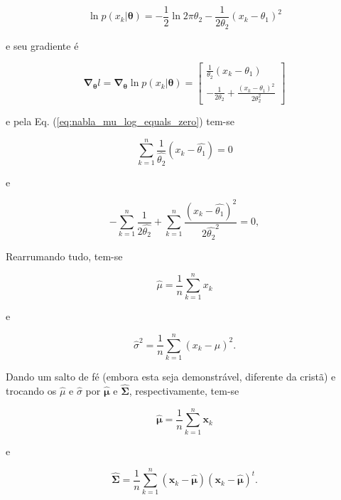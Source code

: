 \documentclass[a4paper,12pt,twocolumn]{article}
\newcommand{\equationref}[1]{Eq. (\ref{eq:#1})}
\newcommand{\tworowsmatrix}[2]
{
    \begin{bmatrix}
            #1\\
            #2
    \end{bmatrix}
}
\begin{document}
\begin{equation}
    \ln p(x_k|\boldsymbol{\theta}) = -\frac{1}{2} \ln 2\pi\theta_2 - \frac{1}{2\theta_2}(x_k - \theta_1)^2
    \label{eq:log_likelihood_mu_sigma_univar}
\end{equation}

\noindent e seu gradiente é

\begin{equation}
    \boldsymbol{\nabla}_{\boldsymbol{\theta}} l = \boldsymbol{\nabla}_{\boldsymbol{\theta}} \ln p(x_k|\boldsymbol{\theta}) = \tworowsmatrix{\frac{1}{\theta_2}(x_k - \theta_1)}{-\frac{1}{2\theta_2} + \frac{(x_k - \theta_1)^2}{2\theta_2^2}}
    \label{eq:grad_log_likelihood_mu_sigma_univar}
\end{equation}

\noindent e pela \equationref{nabla_mu_log_equals_zero} tem-se

\begin{equation}
    \sum_{k=1}^n \frac{1}{\hat{\theta_2}}(x_k - \hat{\theta_1}) = 0
    \label{eq:grad_log_likelihood_mu_sigma_univar_theta_1}
\end{equation}

\noindent e

\begin{equation}
    -\sum_{k=1}^n \frac{1}{2\hat{\theta_2}} + \sum_{k=1}^n \frac{(x_k - \hat{\theta_1})^2}{2\hat{\theta_2}^2} = 0,
    \label{eq:grad_log_likelihood_mu_sigma_univar_theta_2}
\end{equation}

\noindent Rearrumando tudo, tem-se

\begin{equation}
    \hat{\mu} = \frac{1}{n} \sum_{k=1}^n x_k
    \label{eq:mu_optimum_case_2}
\end{equation}

\noindent e

\begin{equation}
    \hat{\sigma}^2 = \frac{1}{n} \sum_{k=1}^n (x_k - \hat{\mu})^2.
    \label{eq:sigma_optimum_case_2}
\end{equation}

Dando um salto de fé (embora esta seja demonstrável, diferente da cristã) e trocando os $\hat{\mu}$ e $\hat{\sigma}$ por $\boldsymbol{\hat{\mu}}$ e $\boldsymbol{\hat{\Sigma}}$, respectivamente, tem-se

\begin{equation}
    \boldsymbol{\hat{\mu}} = \frac{1}{n} \sum_{k=1}^n \boldsymbol{x}_k
    \label{eq:bold_mu_optimum_case_2}
\end{equation}

\noindent e

\begin{equation}
    \boldsymbol{\hat{\Sigma}} = \frac{1}{n} \sum_{k=1}^n (\boldsymbol{x}_k - \boldsymbol{\hat{\mu}})(\boldsymbol{x}_k - \boldsymbol{\hat{\mu}})^t.
    \label{eq:bold_sigma_optimum_case_2}
\end{equation}
\end{document}
